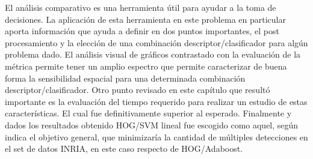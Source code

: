 El análisis comparativo es una herramienta útil para ayudar a la toma de decisiones. La aplicación de esta herramienta en este problema en particular aporta información que ayuda a definir en dos puntos importantes, el post procesamiento y la elección de una combinación descriptor/clasificador para algún problema dado. El análisis visual de gráficos contrastado con la evaluación de la métrica permite tener un amplio espectro que permite caracterizar de buena forma la sensibilidad espacial para una determinada combinación descriptor/clasificador.
Otro punto revisado en este capítulo que resultó importante es la evaluación del tiempo requerido para realizar un estudio de estas características. El cual fue definitivamente superior al esperado.
Finalmente y dados los resultados obtenido HOG/SVM lineal fue escogido como aquel, según indica el objetivo general, que minimizaría la cantidad de múltiples detecciones en el set de datos INRIA, en este caso respecto de HOG/Adaboost. 